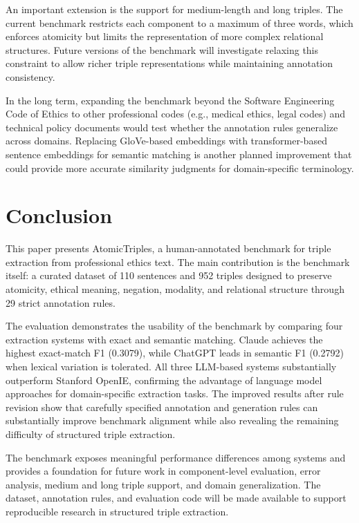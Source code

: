 \documentclass[conference]{IEEEtran}
\begin{document}
An important extension is the support for medium-length and long triples. The current benchmark restricts each component to a maximum of three words, which enforces atomicity but limits the representation of more complex relational structures. Future versions of the benchmark will investigate relaxing this constraint to allow richer triple representations while maintaining annotation consistency.

In the long term, expanding the benchmark beyond the Software Engineering Code of Ethics to other professional codes (e.g., medical ethics, legal codes) and technical policy documents would test whether the annotation rules generalize across domains. Replacing GloVe-based embeddings with transformer-based sentence embeddings for semantic matching is another planned improvement that could provide more accurate similarity judgments for domain-specific terminology.


\section{Conclusion}
This paper presents AtomicTriples, a human-annotated benchmark for triple extraction from professional ethics text. The main contribution is the benchmark itself: a curated dataset of 110 sentences and 952 triples designed to preserve atomicity, ethical meaning, negation, modality, and relational structure through 29 strict annotation rules.

The evaluation demonstrates the usability of the benchmark by comparing four extraction systems with exact and semantic matching. Claude achieves the highest exact-match F1 (0.3079), while ChatGPT leads in semantic F1 (0.2792) when lexical variation is tolerated. All three LLM-based systems substantially outperform Stanford OpenIE, confirming the advantage of language model approaches for domain-specific extraction tasks. The improved results after rule revision show that carefully specified annotation and generation rules can substantially improve benchmark alignment while also revealing the remaining difficulty of structured triple extraction.

The benchmark exposes meaningful performance differences among systems and provides a foundation for future work in component-level evaluation, error analysis, medium and long triple support, and domain generalization. The dataset, annotation rules, and evaluation code will be made available to support reproducible research in structured triple extraction.
\end{document}
